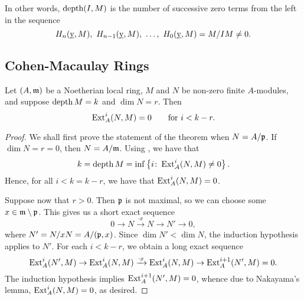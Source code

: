 \begin{remark}
    In other words, $\operatorname{depth}(I, M)$ is the number of successive zero terms from the left in the sequence
    \begin{equation*}
        H_n(\underbar{y}, M),~H_{n - 1}(\underbar{y}, M),~\dots,~H_0(\underbar{y}, M) = M/IM\ne 0.
    \end{equation*}
\end{remark}

\subsection{Cohen-Macaulay Rings}

\begin{theorem}[Ischebeck]
    Let $(A,\mathfrak{m})$ be a Noetherian local ring, $M$ and $N$ be non-zero finite $A$-modules, and suppose $\operatorname{depth} M = k$ and $\dim N = r$. Then
    \begin{equation*}
        \operatorname{Ext}^i_A(N, M) = 0 \qquad\text{for }i < k - r.
    \end{equation*}
\end{theorem}
\begin{proof}
    We shall first prove the statement of the theorem when $N = A/\mathfrak{p}$. If $\dim N = r = 0$, then $N = A/\mathfrak{m}$. Using , we have that 
    \begin{equation*}
        k = \operatorname{depth} M = \inf\left\{i\colon\operatorname{Ext}^i_A(N, M)\ne 0\right\}.
    \end{equation*}
    Hence, for all $i < k = k - r$, we have that $\operatorname{Ext}^i_A(N, M) = 0$.

    Suppose now that $r > 0$. Then $\mathfrak{p}$ is not maximal, so we can choose some $x\in\mathfrak{m}\setminus\mathfrak{p}$. This gives us a short exact sequence 
    \begin{equation*}
        0\to N\xrightarrow{\cdot x} N\to N'\to 0,
    \end{equation*}
    where $N' = N/xN = A/(\mathfrak{p}, x)$. Since $\dim N' < \dim N$, the induction hypothesis applies to $N'$. For each $i < k - r$, we obtain a long exact sequence 
    \begin{equation*}
        \operatorname{Ext}^i_A(N', M)\to\operatorname{Ext}^i_A(N, M)\xrightarrow{\cdot x}\operatorname{Ext}^i_A(N, M)\to\operatorname{Ext}^{i + 1}_A(N', M) = 0.
    \end{equation*}
    The induction hypothesis implies $\operatorname{Ext}^{i + 1}_A(N', M) = 0$, whence due to Nakayama's lemma, $\operatorname{Ext}^i_A(N, M) = 0$, as desired.
\end{proof}

